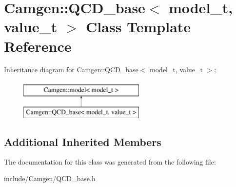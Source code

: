 \hypertarget{a00461}{}\section{Camgen\+:\+:Q\+C\+D\+\_\+base$<$ model\+\_\+t, value\+\_\+t $>$ Class Template Reference}
\label{a00461}
Inheritance diagram for Camgen\+:\+:Q\+C\+D\+\_\+base$<$ model\+\_\+t, value\+\_\+t $>$\+:\begin{figure}[H]
\begin{center}
\leavevmode
\includegraphics[height=2.000000cm]{a00461}
\end{center}
\end{figure}
\subsection*{Additional Inherited Members}


The documentation for this class was generated from the following file\+:\begin{DoxyCompactItemize}
\item 
include/\+Camgen/Q\+C\+D\+\_\+base.\+h\end{DoxyCompactItemize}
